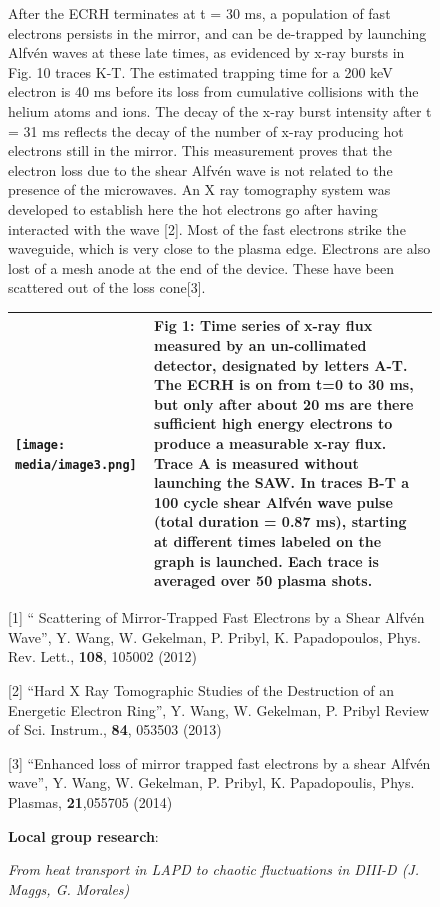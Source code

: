 \documentclass[11pt]{article}
\begin{document}
\begin{description}
\begin{figure}[!htbp]
After the ECRH terminates at t = 30 ms, a population of fast electrons
persists in the mirror, and can be de-trapped by launching Alfvén waves
at these late times, as evidenced by x-ray bursts in Fig. 10 traces K-T.
The estimated trapping time for a 200 keV electron is 40 ms before its
loss from cumulative collisions with the helium atoms and ions. The
decay of the x-ray burst intensity after t = 31 ms reflects the decay of
the number of x-ray producing hot electrons still in the mirror. This
measurement proves that the electron loss due to the shear Alfvén wave
is not related to the presence of the microwaves. An X ray tomography
system was developed to establish here the hot electrons go after having
interacted with the wave {[}2{]}. Most of the fast electrons strike the
waveguide, which is very close to the plasma edge. Electrons are also
lost of a mesh anode at the end of the device. These have been scattered
out of the loss cone{[}3{]}.

\begin{longtable}[c]{@{}ll@{}}
\toprule
\texttt{[image: media/image3.png]} & Fig 1: Time series of x-ray flux
measured by an un-collimated detector, designated by letters A-T. The
ECRH is on from t=0 to 30 ms, but only after about 20 ms are there
sufficient high energy electrons to produce a measurable x-ray flux.
Trace A is measured without launching the SAW. In traces B-T a 100 cycle
shear Alfvén wave pulse (total duration = 0.87 ms), starting at
different times labeled on the graph is launched. Each trace is averaged
over 50 plasma shots.\tabularnewline
\midrule
\endhead
\bottomrule
\end{longtable}

{[}1{]} `` Scattering of Mirror-Trapped Fast Electrons by a Shear Alfvén
Wave'', Y. Wang, W. Gekelman, P. Pribyl, K. Papadopoulos, Phys. Rev.
Lett., \textbf{108}, 105002 (2012)

{[}2{]} ``Hard X Ray Tomographic Studies of the Destruction of an
Energetic Electron Ring'', Y. Wang, W. Gekelman, P. Pribyl Review of
Sci. Instrum., \textbf{84}, 053503 (2013)

{[}3{]} ``Enhanced loss of mirror trapped fast electrons by a shear
Alfvén wave'', Y. Wang, W. Gekelman, P. Pribyl, K. Papadopoulis, Phys.
Plasmas, \textbf{21},055705 (2014)


\textbf{Local group research}:

\emph{From heat transport in LAPD to chaotic fluctuations in DIII-D (J.
Maggs, G. Morales)}


\end{figure}
\end{description}
\end{document}
